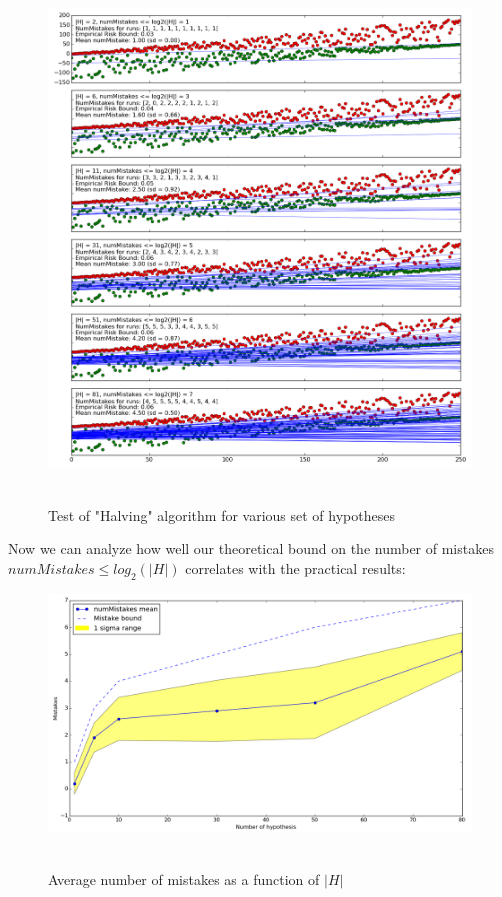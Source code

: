 \documentclass{article}
\begin{document}
\begin{figure}[!htb]
	\centering
	\includegraphics[width=7.2in,clip,keepaspectratio]{mistake_bounds_5runs_v3.png}\
	\caption{Test of "Halving" algorithm for various set of hypotheses}	
\end{figure}     

\pagebreak
Now we can analyze how well our theoretical bound on the number of mistakes $numMistakes \le log_2(|H|)$ correlates with the practical results:
\begin{figure}[!htb]
	\centering
	\includegraphics[width=7in,clip,keepaspectratio]{mistake_bounds_5runs_v2_mean_sd_plot.png}\
	\caption{Average number of mistakes as a function of $|H|$}	
\end{figure} 
\end{document}
